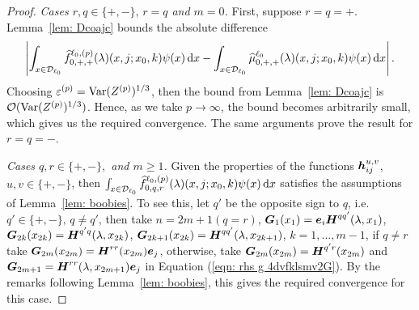 \begin{proof}
	\textit{Cases \(r,q \in \{+,-\}, \, r=q \) and \(m=0\).} First, suppose \(r=q=+\). Lemma~\ref{lem: Dcoajc} bounds the absolute difference 
	\[\left|\int_{x\in\mathcal{D}_{\ell_0}}\widehat f_{0,+,+}^{\ell_0,(p)}(\lambda)(x,j;x_0,k)\psi(x)\, \mathrm{d} x-\int_{x\in\mathcal{D}_{\ell_0}}\widehat \mu_{0,+,+}^{\ell_0}(\lambda)(x,j;x_0,k)\psi(x)\, \mathrm{d} x\right|.\]
	Choosing \(\varepsilon^{(p)}=\mathrm{Var}(Z^{(p)})^{1/3}\), then the bound from Lemma~\ref{lem: Dcoajc} is \(\mathcal O(\mathrm{Var}(Z^{(p)})^{1/3})\). Hence, as we take \(p \to \infty\), the bound becomes arbitrarily small, which gives us the required convergence. The same arguments prove the result for \(r=q=-\). 

	\textit{Cases \(q,r\in \{+,-\},\) and \(m\geq 1\).} Given the properties of the functions \(\boldsymbol h_{ij}^{u,v}\), \(u,v\in\{+,-\}\), then \(\int_{x\in\mathcal{D}_{\ell_0}}\widehat f_{0,q,r}^{\ell_0,(p)}(\lambda)(x,j;x_0,k)\psi(x)\, \mathrm{d} x\) satisfies the assumptions of Lemma~\ref{lem: boobies}. To see this, let \(q'\) be the opposite sign to \(q\), i.e.~\(q'\in\{+,-\},\, q\neq q'\), then take \(n=2m+1(q=r)\), \(\boldsymbol G_1(x_1) = \boldsymbol e_i\boldsymbol H^{qq'}(\lambda, x_1)\), \(\boldsymbol G_{2k}(x_{2k}) = \boldsymbol H^{q'q}(\lambda, x_{2k})\), \(\boldsymbol G_{2k+1}(x_{2k}) = \boldsymbol H^{qq'}(\lambda, x_{2k+1})\), \(k=1,\dots,m-1\), if \(q\neq r\) take \(\boldsymbol G_{2m}(x_{2m}) = \boldsymbol H^{rr}(x_{2m})\boldsymbol e_j\), otherwise, take \(\boldsymbol G_{2m}(x_{2m}) = \boldsymbol H^{q'r}(x_{2m})\) and \(\boldsymbol G_{2m+1} = \boldsymbol H^{rr}(\lambda,x_{2m+1})\boldsymbol e_j\) in Equation (\ref{eqn: rhs g 4dvfklsmv2G}). By the remarks following Lemma~\ref{lem: boobies}, this gives the required convergence for this case. 


\end{proof}
